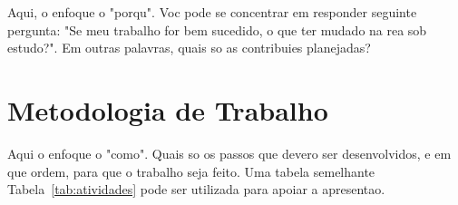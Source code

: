 \documentclass[a4paper,titlepage,12pt]{article}
\begin{document}
Aqui, o enfoque  o "porqu". Voc pode se concentrar em responder  seguinte pergunta: "Se meu trabalho for bem sucedido, o que ter mudado na rea sob estudo?". Em outras palavras, quais so as contribuies planejadas?

\section{Metodologia de Trabalho}
\label{sec:metodologia}

Aqui o enfoque  o "como".  Quais so os passos que devero ser desenvolvidos, e em que ordem, para que o trabalho seja feito. Uma tabela semelhante  Tabela~\ref{tab:atividades} pode ser utilizada para apoiar a apresentao.



% 
\end{document}
